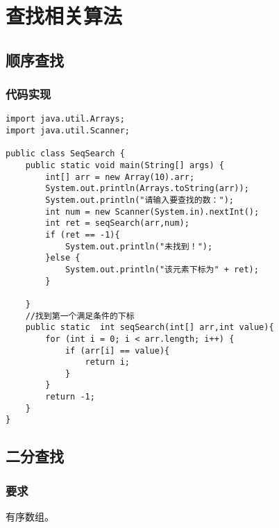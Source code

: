 \documentclass[a4paper]{report}
\begin{document}
\chapter{查找相关算法}
\section{顺序查找}
\subsection{代码实现}

\begin{lstlisting}
import java.util.Arrays;
import java.util.Scanner;

public class SeqSearch {
    public static void main(String[] args) {
        int[] arr = new Array(10).arr;
        System.out.println(Arrays.toString(arr));
        System.out.println("请输入要查找的数：");
        int num = new Scanner(System.in).nextInt();
        int ret = seqSearch(arr,num);
        if (ret == -1){
            System.out.println("未找到！");
        }else {
            System.out.println("该元素下标为" + ret);
        }

    }
    //找到第一个满足条件的下标
    public static  int seqSearch(int[] arr,int value){
        for (int i = 0; i < arr.length; i++) {
            if (arr[i] == value){
                return i;
            }
        }
        return -1;
    }
}
\end{lstlisting}
\section{二分查找}
\subsection{要求}
有序数组。
\end{document}
